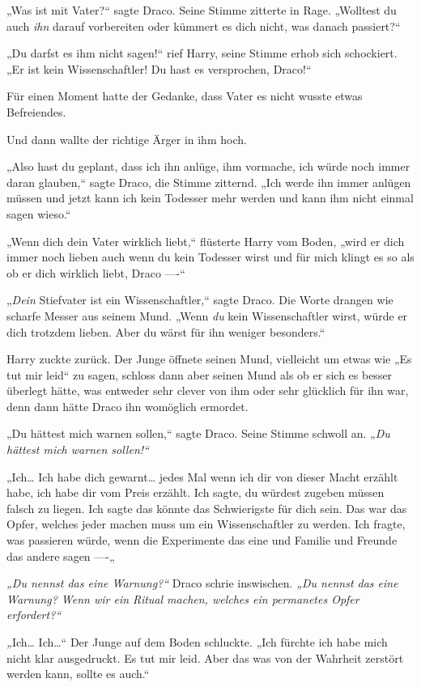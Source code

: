 {„Was ist mit Vater?“ sagte Draco. Seine Stimme zitterte in Rage. „Wolltest du auch \emph{ihn} darauf vorbereiten oder kümmert es dich nicht, was danach passiert?“

„Du darfst es ihm nicht sagen!“ rief Harry, seine Stimme erhob sich schockiert. „Er ist kein Wissenschaftler! Du hast es versprochen, Draco!“

Für einen Moment hatte der Gedanke, dass Vater es nicht wusste etwas Befreiendes.

Und dann wallte der richtige Ärger in ihm hoch.

„Also hast du geplant, dass ich ihn anlüge, ihm vormache, ich würde noch immer daran glauben,“ sagte Draco, die Stimme zitternd. „Ich werde ihn immer anlügen müssen und jetzt kann ich kein Todesser mehr werden und kann ihm nicht einmal sagen wieso.“

„Wenn dich dein Vater wirklich liebt,“ flüsterte Harry vom Boden, „wird er dich immer noch lieben auch wenn du kein Todesser wirst und für mich klingt es so als ob er dich wirklich liebt, Draco ----“

„\emph{Dein} Stiefvater ist ein Wissenschaftler,“ sagte Draco. Die Worte drangen wie scharfe Messer aus seinem Mund. „Wenn \emph{du} kein Wissenschaftler wirst, würde er dich trotzdem lieben. Aber du wärst für ihn weniger besonders.“

Harry zuckte zurück. Der Junge öffnete seinen Mund, vielleicht um etwas wie „Es tut mir leid“ zu sagen, schloss dann aber seinen Mund als ob er sich es besser überlegt hätte, was entweder sehr clever von ihm oder sehr glücklich für ihn war, denn dann hätte Draco ihn womöglich ermordet.

„Du hättest mich warnen sollen,“ sagte Draco. Seine Stimme schwoll an. „\emph{Du hättest mich warnen sollen!“}

„Ich… Ich habe dich gewarnt… jedes Mal wenn ich dir von dieser Macht erzählt habe, ich habe dir vom Preis erzählt. Ich sagte, du würdest zugeben müssen falsch zu liegen. Ich sagte das könnte das Schwierigste für dich sein. Das war das Opfer, welches jeder machen muss um ein Wissenschaftler zu werden. Ich fragte, was passieren würde, wenn die Experimente das eine und Familie und Freunde das andere sagen ----„

\emph{„Du nennst das eine Warnung?“} Draco schrie inswischen. \emph{„Du nennst das eine Warnung? Wenn wir ein Ritual machen, welches ein permanetes Opfer erfordert?“}

\emph{„}Ich… Ich…“ Der Junge auf dem Boden schluckte. „Ich fürchte ich habe mich nicht klar ausgedruckt. Es tut mir leid. Aber das was von der Wahrheit zerstört werden kann, sollte es auch.“

}
